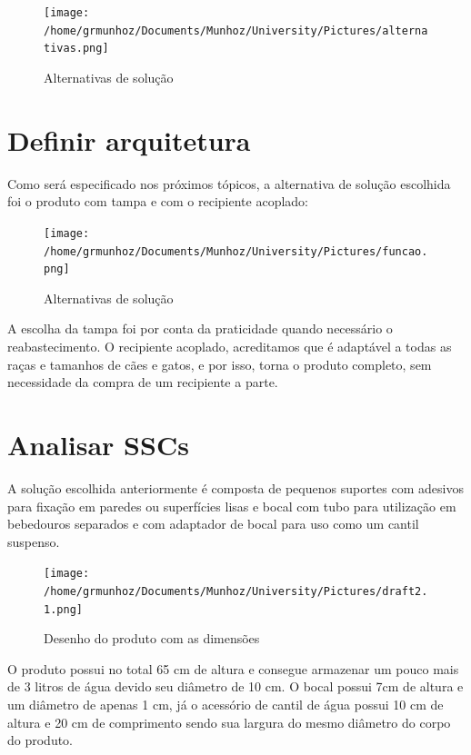 \documentclass[
	12pt,				%
	openright,			%
	oneside,			%
	a4paper,			%
	english,			%
	french,				%
	spanish,			%
	brazil				%
	]{abntex2}
\begin{document}
\begin{figure}[H]
\begin{center}
\caption{Alternativas de solução}
\texttt{[image: /home/grmunhoz/Documents/Munhoz/University/Pictures/alternativas.png]} 
\label{figetapas}
\end{center}
\end{figure}

\section{Definir arquitetura}

Como será especificado nos próximos tópicos, a alternativa de solução escolhida foi o produto com tampa e com o recipiente acoplado:

\begin{figure}[H]
\begin{center}
\caption{Alternativas de solução}
\texttt{[image: /home/grmunhoz/Documents/Munhoz/University/Pictures/funcao.png]} 
\label{figetapas}
\end{center}
\end{figure}


A escolha da tampa foi por conta da praticidade quando necessário o reabastecimento. O recipiente acoplado, acreditamos que é adaptável a todas as raças e tamanhos de cães e gatos, e por isso, torna o produto completo, sem necessidade da compra de um recipiente a parte.

\section{Analisar SSCs}

A solução escolhida anteriormente é composta de pequenos suportes com adesivos para fixação em paredes ou superfícies lisas e bocal com tubo para utilização em bebedouros separados e com adaptador de bocal para uso como um cantil suspenso.

\begin{figure}[H]
\begin{center}
\caption{Desenho do produto com as dimensões}
\texttt{[image: /home/grmunhoz/Documents/Munhoz/University/Pictures/draft2.1.png]} 
\label{figetapas}
\end{center}
\end{figure}


O produto possui no total 65 cm de altura e consegue armazenar um pouco mais de 3 litros de água devido seu diâmetro de 10 cm. O bocal possui 7cm de altura e um diâmetro de apenas 1 cm, já o acessório de cantil de água possui 10 cm de altura e 20 cm de comprimento sendo sua largura do mesmo diâmetro do corpo do produto. 
\end{document}
